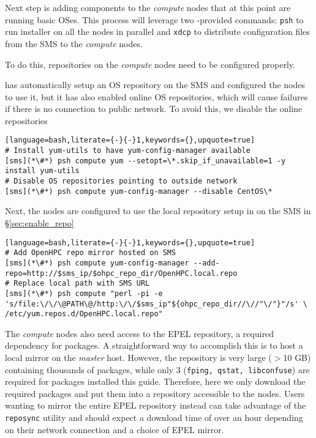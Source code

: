 
Next step is adding \OHPC{} components to the {\em compute} nodes that at this
point are running basic OSes.  This process will leverage two \xCAT{}-provided
commands: \texttt{psh} to run \texttt{\pkgmgr{}} installer on all the
nodes in parallel  and \texttt{xdcp} to distribute configuration files from the
SMS to the {\em compute} nodes. 

\noindent To do this, repositories on the {\em compute} nodes need to be configured
properly. 

\xCAT{} has automatically setup an  OS repository on the SMS and configured the
nodes to use it, but it has  also enabled online OS repositories, which will
cause  \texttt{\pkgmgr{}} failures if there is no connection to public network. 
To avoid this, we disable the online repositories

\begin{lstlisting}[language=bash,literate={-}{-}1,keywords={},upquote=true]
# Install yum-utils to have yum-config-manager available
[sms](*\#*) psh compute yum --setopt=\*.skip_if_unavailable=1 -y install yum-utils
# Disable OS repositories pointing to outside network
[sms](*\#*) psh compute yum-config-manager --disable CentOS\*
\end{lstlisting}

\noindent Next, the nodes are configured to use the local \OHPC{} repository
setup in on the SMS in \S\ref{sec:enable_repo}

\begin{lstlisting}[language=bash,literate={-}{-}1,keywords={},upquote=true]
# Add OpenHPC repo mirror hosted on SMS
[sms](*\#*) psh compute yum-config-manager --add-repo=http://$sms_ip/$ohpc_repo_dir/OpenHPC.local.repo
# Replace local path with SMS URL
[sms](*\#*) psh compute "perl -pi -e 's/file:\/\/\@PATH\@/http:\/\/$sms_ip"${ohpc_repo_dir//\//"\/"}"/s' \
/etc/yum.repos.d/OpenHPC.local.repo"
\end{lstlisting}

The {\em compute} nodes also need access to the EPEL repository, a required
dependency for \OHPC{} packages. A straightforward way to accomplish this is to
host a local mirror on the {\em master} host. However, the repository is very
large ($>$10 GB) containing thousands of packages, while only 3 (\texttt{fping,
qstat, libconfuse}) are required for packages installed this guide.  Therefore,
here we only download the required packages and put them into a repository
accessible to the nodes.  Users wanting to mirror the entire EPEL repository
instead can take advantage of the \texttt{reposync} utility and should expect a
download time of over an hour depending on their network connection and a choice
of EPEL mirror.

